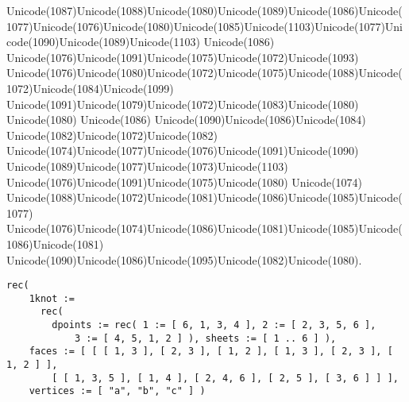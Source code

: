 \documentclass[a4paper,11pt]{report}
\begin{document}
{{Unicode(1087)Unicode(1088)Unicode(1080)Unicode(1089)Unicode(1086)Unicode(1077)Unicode(1076)Unicode(1080)Unicode(1085)Unicode(1103)Unicode(1077)Unicode(1090)Unicode(1089)Unicode(1103)
Unicode(1086)
Unicode(1076)Unicode(1091)Unicode(1075)Unicode(1072)Unicode(1093)
Unicode(1076)Unicode(1080)Unicode(1072)Unicode(1075)Unicode(1088)Unicode(1072)Unicode(1084)Unicode(1099)
Unicode(1091)Unicode(1079)Unicode(1072)Unicode(1083)Unicode(1080)
Unicode(1080) Unicode(1086) Unicode(1090)Unicode(1086)Unicode(1084)
Unicode(1082)Unicode(1072)Unicode(1082)
Unicode(1074)Unicode(1077)Unicode(1076)Unicode(1091)Unicode(1090)
Unicode(1089)Unicode(1077)Unicode(1073)Unicode(1103)
Unicode(1076)Unicode(1091)Unicode(1075)Unicode(1080) Unicode(1074)
Unicode(1088)Unicode(1072)Unicode(1081)Unicode(1086)Unicode(1085)Unicode(1077)
Unicode(1076)Unicode(1074)Unicode(1086)Unicode(1081)Unicode(1085)Unicode(1086)Unicode(1081)
Unicode(1090)Unicode(1086)Unicode(1095)Unicode(1082)Unicode(1080). 
\begin{Verbatim}[commandchars=!@|,fontsize=\small,frame=single,label=Пример]
  rec(
    1knot :=
      rec(
        dpoints := rec( 1 := [ 6, 1, 3, 4 ], 2 := [ 2, 3, 5, 6 ],
            3 := [ 4, 5, 1, 2 ] ), sheets := [ 1 .. 6 ] ),
    faces := [ [ [ 1, 3 ], [ 2, 3 ], [ 1, 2 ], [ 1, 3 ], [ 2, 3 ], [ 1, 2 ] ],
        [ [ 1, 3, 5 ], [ 1, 4 ], [ 2, 4, 6 ], [ 2, 5 ], [ 3, 6 ] ] ],
    vertices := [ "a", "b", "c" ] )
  			

\end{Verbatim}}}
\end{document}
